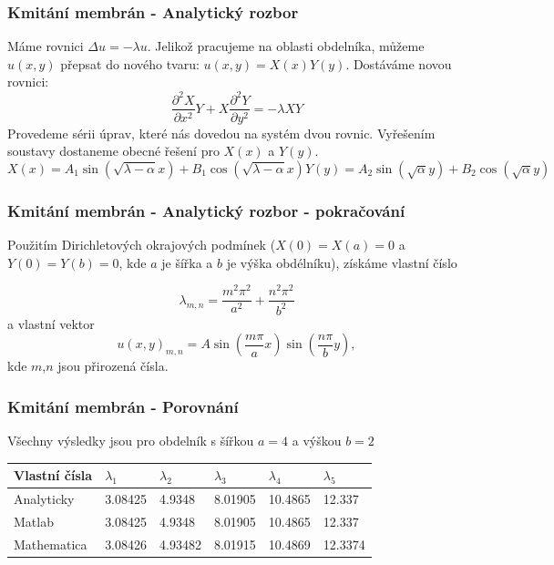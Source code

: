 \documentclass[xcolor=table]{beamer}
\begin{document}
\begin{frame}
\frametitle{Kmitání membrán - Analytický rozbor}
\pause
Máme rovnici $\Delta u=-\lambda u$. Jelikož pracujeme na oblasti obdelníka, můžeme $u(x,y)$ přepsat do nového tvaru: $u(x,y)=X(x) Y(y)$.
\pause
Dostáváme novou rovnici:
\begin{equation}
   \frac{\partial^2 X}{\partial x^2} Y
      + X \frac{\partial^2 Y}{\partial y^2}=-\lambda X Y
\end{equation}
\pause
Provedeme sérii úprav, které nás dovedou na systém dvou rovnic. Vyřešením soustavy dostaneme obecné řešení pro $X(x)$ a $Y(y)$.
\pause
\begin{subequations} 
\begin{equation}
X(x)=A_1 \sin{(\sqrt{\lambda-\alpha}x)}+B_1 \cos{(\sqrt{\lambda-\alpha}x)}
\end{equation}
\begin{equation}
Y(y)=A_2 \sin{(\sqrt{\alpha}y)}+B_2 \cos{(\sqrt{\alpha}y)}
\end{equation}
\end{subequations}

\end{frame}

\begin{frame}
\frametitle{Kmitání membrán - Analytický rozbor - pokračování}
Použitím Dirichletových okrajových podmínek ($X(0)=X(a)=0$ a $Y(0)=Y(b)=0$, kde $a$ je šířka a $b$ je výška obdélníku), získáme vlastní číslo

\begin{equation}
\lambda_{m,n}=\frac{m^2\pi^2}{a^2}+\frac{n^2\pi^2}{b^2}
\end{equation}
\pause
a vlastní vektor
\begin{equation}
u(x,y)_{m,n}=A\sin{(\frac{m\pi}{a}x)}\sin{(\frac{n\pi}{b}y)},
\end{equation}
kde $m$,$n$ jsou přirozená čísla.
\end{frame}

\begin{frame}
\frametitle{Kmitání membrán - Porovnání}
Všechny výsledky jsou pro obdelník s šířkou $a=4$ a výškou $b=2$

\begin{table}[]
\begin{tabular}{|llllll|}
\hline
\rowcolor[HTML]{EFEFEF} 
\cellcolor[HTML]{C0C0C0}Vlastní čísla & $\lambda_1$      & $\lambda_2$        & $\lambda_3$    & $\lambda_4$    & $\lambda_5$     \\ \hline
\rowcolor[HTML]{CBCEFB} 
\cellcolor[HTML]{9698ED}Analyticky    & 3.08425 & 4.9348  & 8.01905 & 10.4865 & 12.337  \\ \hline
\rowcolor[HTML]{FFCE93} 
\cellcolor[HTML]{FE996B}Matlab        & 3.08425  & 4.9348  & 8.01905  & 10.4865 & 12.337  \\ \hline
\rowcolor[HTML]{FFCCC9} 
\cellcolor[HTML]{FD6864}Mathematica   & 3.08426 & 4.93482 & 8.01915 & 10.4869 & 12.3374 \\ \hline
\end{tabular}
\end{table}

\end{frame}
\end{document}
